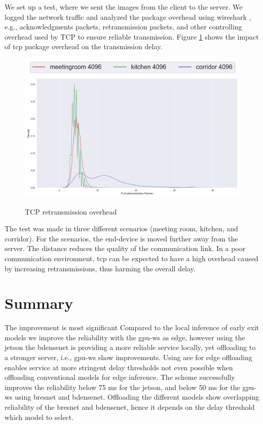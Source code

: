 We set up a test, where we sent the images from the client to the server. We logged the network traffic and analyzed the package overhead using \gls{wireshark} \cite{noauthor_wireshark_nodate}, e.g., acknowledgments packets, retransmission packets, and other controlling overhead used by TCP to ensure reliable transmission.  Figure \ref{fig:tcp-overhead} shows the impact of \gls{tcp} package overhead on the transmission delay. 
\begin{figure}
	\centering
	\includegraphics[width=.5\linewidth]{figures/tcp/density_legend}
	\includegraphics[width=.8\linewidth]{figures/tcp/density}
	\caption[TCP retransmission overhead]{TCP retransmission overhead}
	\label{fig:tcp-overhead}
\end{figure}
The test was made in three different scenarios (meeting room, kitchen, and corridor). For the scenarios, the end-device is moved further away from the server. The distance reduces the quality of the communication link. In a poor communication environment, \gls{tcp} can be expected to have a high overhead caused by increasing retransmissions, thus harming the overall delay.  


\section{Summary} \label{sec:edge-summary}


The improvement is most significant  Compared to the local inference of early exit models we improve the reliability with the \gls{gpu-ws} as edge, however using the \gls{jetson} the \gls{bdensenet} is providing a more reliable service locally, yet offloading to a stronger server, i.e., \gls{gpu-ws} show improvements.
Using \gls{aee} for edge offloading enables service at more stringent delay thresholds not even possible when offloading conventional models for edge inference. The scheme successfully improves the reliability below 75 ms for the \gls{jetson}, and below 50 ms for the \gls{gpu-ws} using \gls{bresnet} and \gls{bdensenet}. Offloading the different models show overlapping reliability of the \gls{bresnet} and \gls{bdensenet}, hence it depends on the delay threshold which model to select.



